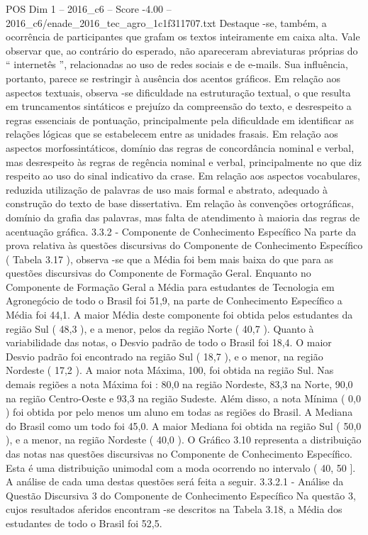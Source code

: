 \begin{textsample}{POS Dim 1 – 2016\_c6 – Score -4.00 – 2016\_c6/enade\_2016\_tec\_agro\_1c1f311707.txt}
Destaque -se, também, a ocorrência de participantes que grafam os textos inteiramente em caixa alta.
Vale observar que, ao contrário do esperado, não apareceram abreviaturas próprias do “ internetês ”, relacionadas ao uso de redes sociais e de e-mails.
Sua influência, portanto, parece se restringir à ausência dos acentos gráficos.
Em relação aos aspectos textuais, observa -se dificuldade na estruturação textual, o que resulta em truncamentos sintáticos e prejuízo da compreensão do texto, e desrespeito a regras essenciais de pontuação, principalmente pela dificuldade em identificar as relações lógicas que se estabelecem entre as unidades frasais.
Em relação aos aspectos morfossintáticos, domínio das regras de concordância nominal e verbal, mas desrespeito às regras de regência nominal e verbal, principalmente no que diz respeito ao uso do sinal indicativo da crase.
Em relação aos aspectos vocabulares, reduzida utilização de palavras de uso mais formal e abstrato, adequado à construção do texto de base dissertativa.
Em relação às convenções ortográficas, domínio da grafia das palavras, mas falta de atendimento à maioria das regras de acentuação gráfica. 3.3.2 - Componente de Conhecimento Específico Na parte da prova relativa às questões discursivas do Componente de Conhecimento Específico ( Tabela 3.17 ), observa -se que a Média foi bem mais baixa do que para as questões discursivas do Componente de Formação Geral.
Enquanto no Componente de Formação Geral a Média para estudantes de Tecnologia em Agronegócio de todo o Brasil foi 51,9, na parte de Conhecimento Específico a Média foi 44,1.
A maior Média deste componente foi obtida pelos estudantes da região Sul ( 48,3 ), e a menor, pelos da região Norte ( 40,7 ).
Quanto à variabilidade das notas, o Desvio padrão de todo o Brasil foi 18,4.
O maior Desvio padrão foi encontrado na região Sul ( 18,7 ), e o menor, na região Nordeste ( 17,2 ).
A maior nota Máxima, 100, foi obtida na região Sul.
Nas demais regiões a nota Máxima foi : 80,0 na região Nordeste, 83,3 na Norte, 90,0 na região Centro-Oeste e 93,3 na região Sudeste.
Além disso, a nota Mínima ( 0,0 ) foi obtida por pelo menos um aluno em todas as regiões do Brasil.
A Mediana do Brasil como um todo foi 45,0.
A maior Mediana foi obtida na região Sul ( 50,0 ), e a menor, na região Nordeste ( 40,0 ).
O Gráfico 3.10 representa a distribuição das notas nas questões discursivas no Componente de Conhecimento Específico.
Esta é uma distribuição unimodal com a moda ocorrendo no intervalo ( 40, 50 ].
A análise de cada uma destas questões será feita a seguir. 3.3.2.1 - Análise da Questão Discursiva 3 do Componente de Conhecimento Específico Na questão 3, cujos resultados aferidos encontram -se descritos na Tabela 3.18, a Média dos estudantes de todo o Brasil foi 52,5.

\end{textsample}
